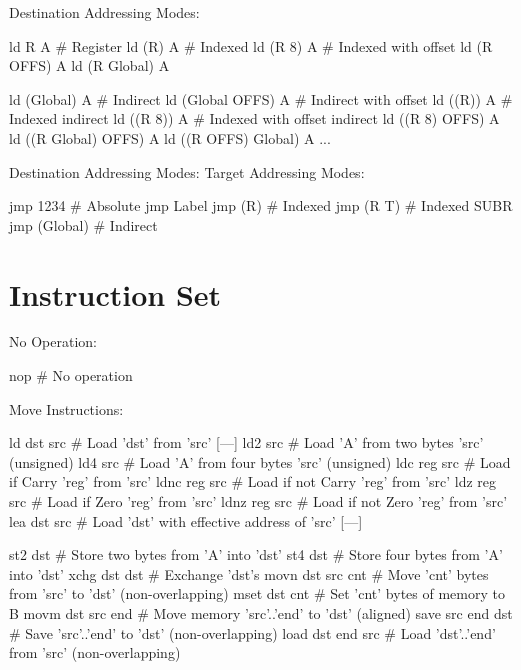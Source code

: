 Destination Addressing Modes:

\begin{wideverbatim}
ld R A               # Register
ld (R) A             # Indexed
ld (R 8) A           # Indexed with offset
ld (R OFFS) A
ld (R Global) A

\end{wideverbatim}

\begin{wideverbatim}

ld (Global) A        # Indirect
ld (Global OFFS) A   # Indirect with offset
ld ((R)) A           # Indexed indirect
ld ((R 8)) A         # Indexed with offset indirect
ld ((R 8) OFFS) A
ld ((R Global) OFFS) A
ld ((R OFFS) Global) A
...
\end{wideverbatim}

Destination Addressing Modes:
Target Addressing Modes:

\begin{wideverbatim}
jmp 1234             # Absolute
jmp Label
jmp (R)              # Indexed
jmp (R T)            # Indexed SUBR
jmp (Global)         # Indirect
\end{wideverbatim}


\section{Instruction Set}
\label{sec:generic-vm-assembler-instruction-set}

No Operation:

\begin{wideverbatim}
nop               # No operation
\end{wideverbatim}


Move Instructions:
\begin{wideverbatim}
ld dst src        # Load 'dst' from 'src' [---]
ld2 src           # Load 'A' from two bytes 'src' (unsigned)
ld4 src           # Load 'A' from four bytes 'src' (unsigned)
ldc reg src       # Load if Carry 'reg' from 'src'
ldnc reg src      # Load if not Carry 'reg' from 'src'
ldz reg src       # Load if Zero 'reg' from 'src'
ldnz reg src      # Load if not Zero 'reg' from 'src'
lea dst src       # Load 'dst' with effective address of 'src' [---]

\end{wideverbatim}

\begin{wideverbatim}

st2 dst           # Store two bytes from 'A' into 'dst'
st4 dst           # Store four bytes from 'A' into 'dst'
xchg dst dst      # Exchange 'dst's
movn dst src cnt  # Move 'cnt' bytes from 'src' to 'dst' (non-overlapping)
mset dst cnt      # Set 'cnt' bytes of memory to B
movm dst src end  # Move memory 'src'..'end' to 'dst' (aligned)
save src end dst  # Save 'src'..'end' to 'dst' (non-overlapping)
load dst end src  # Load 'dst'..'end' from 'src' (non-overlapping)
\end{wideverbatim}

